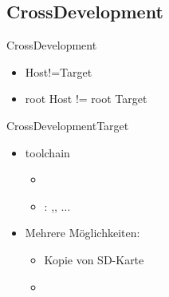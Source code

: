 \subsection{CrossDevelopment}

\begin{frame}{CrossDevelopment}
 \begin{itemize}
  \item Host!=Target
  \item root Host != root Target
 \end{itemize}
\end{frame}



\begin{frame}{CrossDevelopment}{Target \target}
 \begin{itemize}
  \item toolchain
  \begin{itemize}
   \item {}
   \item \cod{*}: ,, $\dots$
  \end{itemize}
  \item {} Mehrere Möglichkeiten:
  \begin{itemize}
   \item Kopie von SD-Karte 
   \item {}
  \end{itemize}
 \end{itemize}
\end{frame}

